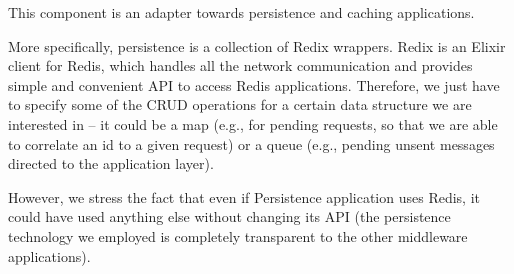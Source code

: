 
This component is an adapter towards persistence and caching applications.

More specifically, persistence is a collection of Redix wrappers. Redix is an
Elixir client for Redis, which handles all the network communication and
provides simple and convenient API to access Redis applications.
Therefore, we just have to specify some of the CRUD operations for a certain
data structure we are interested in -- it could be a map (e.g., for pending
requests, so that we are able to correlate an id to a given request) or a
queue (e.g., pending unsent messages directed to the application layer).

However, we stress the fact that even if Persistence application uses Redis, it
could have used anything else without changing its API (the persistence
technology we employed is completely transparent to the other middleware
applications).
